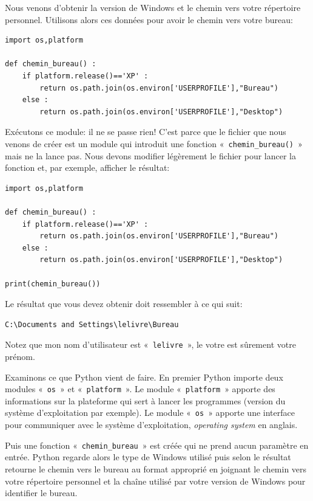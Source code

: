 Nous venons d'obtenir la version de Windows et le chemin vers votre répertoire personnel.
Utilisons alors ces données pour avoir le chemin vers votre bureau:

\begin{Verbatim}[frame=single,rulecolor=\color{mbleu}, label=à taper]
import os,platform

def chemin_bureau() :
    if platform.release()=='XP' :
        return os.path.join(os.environ['USERPROFILE'],"Bureau")
    else :
        return os.path.join(os.environ['USERPROFILE'],"Desktop")
\end{Verbatim}

Exécutons ce module: il ne se passe rien! C'est parce que le fichier que nous venons de créer est un module qui introduit une fonction «~\texttt{chemin\_bureau()}~» mais ne la lance pas. Nous devons modifier légèrement le fichier pour lancer la fonction et, par exemple, afficher le résultat:

\begin{Verbatim}[frame=single,rulecolor=\color{mbleu}, label=à taper]
import os,platform

def chemin_bureau() :
    if platform.release()=='XP' :
        return os.path.join(os.environ['USERPROFILE'],"Bureau")
    else :
        return os.path.join(os.environ['USERPROFILE'],"Desktop")
    
print(chemin_bureau())
\end{Verbatim}

Le résultat que vous devez obtenir doit ressembler à ce qui suit:

\begin{Verbatim}[frame=single,rulecolor=\color{gray}, label=résultat]
C:\Documents and Settings\lelivre\Bureau
\end{Verbatim}

Notez que mon nom d'utilisateur est «~\texttt{lelivre}~», le votre est sûrement votre prénom.

Examinons ce que Python vient de faire. En premier Python importe deux modules «~\texttt{os}~» et «~\texttt{platform}~». Le module «~\texttt{platform}~» apporte des informations sur la plateforme qui sert à lancer les programmes (version du système d'exploitation par exemple). Le module «~\texttt{os}~» apporte une interface pour communiquer avec le système d'exploitation, \emph{operating system} en anglais.

Puis une fonction «~\texttt{chemin\_bureau}~» est créée qui ne prend aucun paramètre en entrée. Python regarde alors le type de Windows utilisé puis selon le résultat retourne le chemin vers le bureau au format approprié en joignant le chemin vers votre répertoire personnel et la chaîne utilisé par votre version de Windows pour identifier le bureau.

